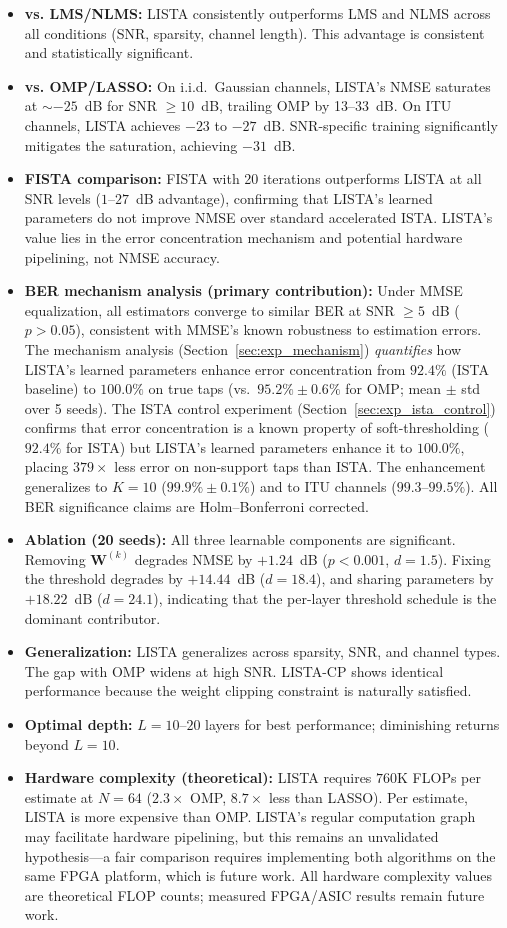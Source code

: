\documentclass[a4paper,fleqn]{cas-sc}
\begin{document}
\begin{itemize}
\item \textbf{vs. LMS/NLMS:} LISTA consistently outperforms LMS and NLMS across all conditions (SNR, sparsity, channel length). This advantage is consistent and statistically significant.
\item \textbf{vs. OMP/LASSO:} On i.i.d.~Gaussian channels, LISTA's NMSE saturates at $\sim$$-25$~dB for SNR $\geq 10$~dB, trailing OMP by 13--33~dB. On ITU channels, LISTA achieves $-23$ to $-27$~dB. SNR-specific training significantly mitigates the saturation, achieving $-31$~dB.
\item \textbf{FISTA comparison:} FISTA with 20 iterations outperforms LISTA at all SNR levels ($1$--$27$~dB advantage), confirming that LISTA's learned parameters do not improve NMSE over standard accelerated ISTA. LISTA's value lies in the error concentration mechanism and potential hardware pipelining, not NMSE accuracy.
\item \textbf{BER mechanism analysis (primary contribution):} Under MMSE equalization, all estimators converge to similar BER at SNR $\geq 5$~dB ($p > 0.05$), consistent with MMSE's known robustness to estimation errors. The mechanism analysis (Section~\ref{sec:exp_mechanism}) \emph{quantifies} how LISTA's learned parameters enhance error concentration from $92.4\%$ (ISTA baseline) to $100.0\%$ on true taps (vs.~$95.2\% \pm 0.6\%$ for OMP; mean $\pm$ std over 5 seeds). The ISTA control experiment (Section~\ref{sec:exp_ista_control}) confirms that error concentration is a known property of soft-thresholding ($92.4\%$ for ISTA) but LISTA's learned parameters enhance it to $100.0\%$, placing $379\times$ less error on non-support taps than ISTA. The enhancement generalizes to $K=10$ ($99.9\% \pm 0.1\%$) and to ITU channels ($99.3$--$99.5\%$). All BER significance claims are Holm--Bonferroni corrected.
\item \textbf{Ablation (20 seeds):} All three learnable components are significant. Removing $\mathbf{W}^{(k)}$ degrades NMSE by $+1.24$~dB ($p < 0.001$, $d = 1.5$). Fixing the threshold degrades by $+14.44$~dB ($d = 18.4$), and sharing parameters by $+18.22$~dB ($d = 24.1$), indicating that the per-layer threshold schedule is the dominant contributor.
\item \textbf{Generalization:} LISTA generalizes across sparsity, SNR, and channel types. The gap with OMP widens at high SNR. LISTA-CP shows identical performance because the weight clipping constraint is naturally satisfied.
\item \textbf{Optimal depth:} $L=10$--$20$ layers for best performance; diminishing returns beyond $L=10$.
\item \textbf{Hardware complexity (theoretical):} LISTA requires $760$K FLOPs per estimate at $N=64$ ($2.3\times$ OMP, $8.7\times$ less than LASSO). Per estimate, LISTA is more expensive than OMP. LISTA's regular computation graph may facilitate hardware pipelining, but this remains an unvalidated hypothesis---a fair comparison requires implementing both algorithms on the same FPGA platform, which is future work. All hardware complexity values are theoretical FLOP counts; measured FPGA/ASIC results remain future work.
\end{itemize}
\end{document}
